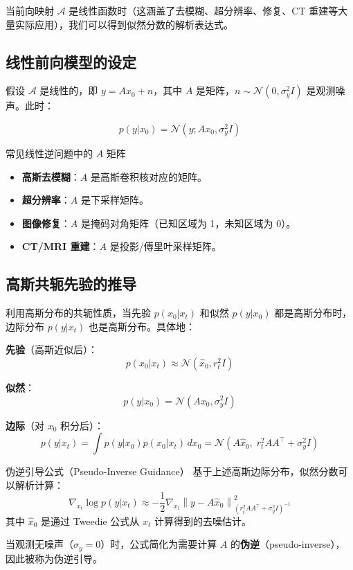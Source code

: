 \documentclass[a4paper]{article}
\begin{document}
当前向映射 $\mathcal{A}$ 是线性函数时（这涵盖了去模糊、超分辨率、修复、CT 重建等大量实际应用），我们可以得到似然分数的解析表达式。

\subsection{线性前向模型的设定}

假设 $\mathcal{A}$ 是线性的，即 $y = A x_0 + n$，其中 $A$ 是矩阵，$n \sim \mathcal{N}(0, \sigma_y^2 I)$ 是观测噪声。此时：

$$
p(y | x_0) = \mathcal{N}(y; A x_0, \sigma_y^2 I)
$$

\begin{knowledgebox}{常见线性逆问题中的 $A$ 矩阵}
\begin{itemize}
    \item \textbf{高斯去模糊}：$A$ 是高斯卷积核对应的矩阵。
    \item \textbf{超分辨率}：$A$ 是下采样矩阵。
    \item \textbf{图像修复}：$A$ 是掩码对角矩阵（已知区域为 1，未知区域为 0）。
    \item \textbf{CT/MRI 重建}：$A$ 是投影/傅里叶采样矩阵。
\end{itemize}
\end{knowledgebox}

\subsection{高斯共轭先验的推导}

利用高斯分布的共轭性质，当先验 $p(x_0 | x_t)$ 和似然 $p(y|x_0)$ 都是高斯分布时，边际分布 $p(y | x_t)$ 也是高斯分布。具体地：

\textbf{先验}（高斯近似后）：
$$
p(x_0 | x_t) \approx \mathcal{N}(\hat{x}_0, r_t^2 I)
$$

\textbf{似然}：
$$
p(y | x_0) = \mathcal{N}(A x_0, \sigma_y^2 I)
$$

\textbf{边际}（对 $x_0$ 积分后）：
$$
p(y | x_t) = \int p(y | x_0) p(x_0 | x_t) \, dx_0 = \mathcal{N}(A \hat{x}_0, \; r_t^2 A A^\top + \sigma_y^2 I)
$$

\begin{importantbox}{伪逆引导公式（Pseudo-Inverse Guidance）}
基于上述高斯边际分布，似然分数可以解析计算：
$$
\nabla_{x_t} \log p(y | x_t) \approx -\frac{1}{2} \nabla_{x_t} \left\| y - A \hat{x}_0 \right\|^2_{(r_t^2 A A^\top + \sigma_y^2 I)^{-1}}
$$
其中 $\hat{x}_0$ 是通过 Tweedie 公式从 $x_t$ 计算得到的去噪估计。

当观测无噪声（$\sigma_y = 0$）时，公式简化为需要计算 $A$ 的\textbf{伪逆}（pseudo-inverse），因此被称为伪逆引导。
\end{importantbox}
\end{document}
